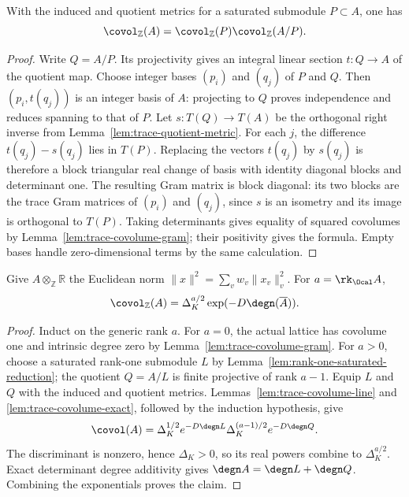 \begin{lemma}
\label{lem:trace-covolume-exact}
\leanok
With the induced and quotient metrics for a saturated submodule
$P\subset A$, one has
\[
 \covol_{\mathbb Z}(A)=\covol_{\mathbb Z}(P)\covol_{\mathbb Z}(A/P).
\]
\end{lemma}
\begin{proof}
Write $Q=A/P$. Its projectivity gives an integral linear section
$t:Q\to A$ of the quotient map. Choose integer bases $(p_i)$ and $(q_j)$
of $P$ and $Q$. Then $(p_i,t(q_j))$ is an integer basis of $A$:
projecting to $Q$ proves independence and reduces spanning to that of $P$.
Let $s:T(Q)\to T(A)$ be the orthogonal right inverse from
Lemma~\ref{lem:trace-quotient-metric}. For each $j$, the difference
$t(q_j)-s(q_j)$ lies in $T(P)$. Replacing the vectors $t(q_j)$ by $s(q_j)$
is therefore a block triangular real change of basis with identity
diagonal blocks and determinant one. The resulting Gram matrix is block
diagonal: its two blocks are the trace Gram matrices of $(p_i)$ and
$(q_j)$, since $s$ is an isometry and its image is orthogonal to $T(P)$.
Taking determinants gives equality of squared covolumes by
Lemma~\ref{lem:trace-covolume-gram}; their positivity gives the formula.
Empty bases handle zero-dimensional terms by the same calculation.
\end{proof}

\begin{lemma}
\label{lem:restriction-covolume}
\leanok
Give $A\otimes_{\mathbb Z}\mathbb R$ the Euclidean norm
$\|x\|^2=\sum_v w_v\|x_v\|_v^2$. For $a=\rk_\Ocal A$,
\[
 \covol_\mathbb Z(A)=\Delta_K^{a/2}\exp(-D\degn(\overline A)).
\]
\end{lemma}
\begin{proof}
Induct on the generic rank $a$. For $a=0$, the actual lattice has
covolume one and intrinsic degree zero by
Lemma~\ref{lem:trace-covolume-gram}. For $a>0$, choose a saturated
rank-one submodule $L$ by Lemma~\ref{lem:rank-one-saturated-reduction};
the quotient $Q=A/L$ is finite projective of rank $a-1$.
Equip $L$ and $Q$ with the induced and quotient metrics.
Lemmas~\ref{lem:trace-covolume-line} and \ref{lem:trace-covolume-exact},
followed by the induction hypothesis, give
\[
 \covol(A)
 =\Delta_K^{1/2}e^{-D\degn L}
   \Delta_K^{(a-1)/2}e^{-D\degn Q}.
\]
The discriminant is nonzero, hence $\Delta_K>0$, so its real powers
combine to $\Delta_K^{a/2}$. Exact determinant degree additivity gives
$\degn A=\degn L+\degn Q$. Combining the exponentials proves the claim.
\end{proof}
